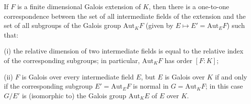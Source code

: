 If $F$ is a finite dimensional Galois extension of $K$, then there is a one-to-one correspondence between the set of all intermediate fields of the extension and the set of all subgroups of the Galois group $\mathrm{Aut}_K F$ (given by $E \mapsto E' = \mathrm{Aut}_E F$) such that:

(i) the relative dimension of two intermediate fields is equal to the relative index of the corresponding subgroups; in particular, $\mathrm{Aut}_K F$ has order $[F : K]$;

(ii) $F$ is Galois over every intermediate field $E$, but $E$ is Galois over $K$ if and only if the corresponding subgroup $E' = \mathrm{Aut}_E F$ is normal in $G = \mathrm{Aut}_K F$; in this case $G/E'$ is (isomorphic to) the Galois group $\mathrm{Aut}_K E$ of $E$ over $K$.
